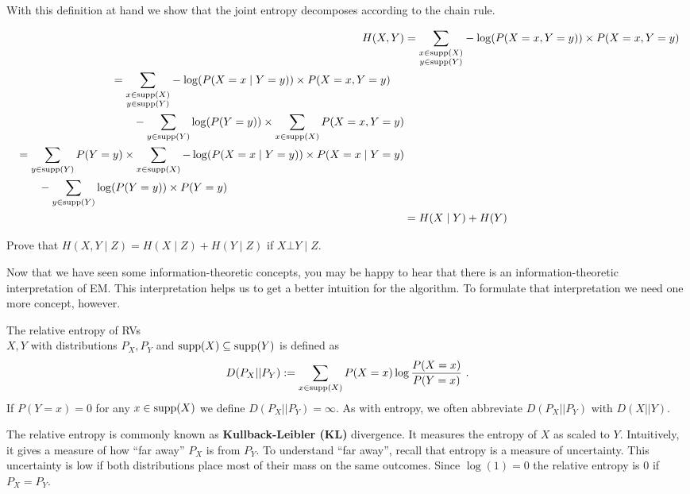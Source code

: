 With this definition at hand we show that the joint entropy decomposes according to the
chain rule.

\begin{align*}
H(X,Y) &= \underset{\substack{x \in \operatorname{supp}(X)\\y \in \operatorname{supp}(Y)}}{\sum} -\log(P(X=x,Y=y)) \times P(X=x, Y=y) \\
\begin{split}
&= \underset{\substack{x \in \operatorname{supp}(X)\\ y \in \operatorname{supp}(Y)}}{\sum} -\log(P(X=x \mid  Y=y)) \times P(X=x,Y=y) \\ 
&\qquad - \underset{y \in \operatorname{supp}(Y)}{\sum}\log(P(Y=y)) \times \sum_{x \in \operatorname{supp}(X)} P(X=x,Y=y) 
\end{split} \\
\begin{split}
&=\sum_{y \in \operatorname{supp}(Y)} P(Y=y) \times \sum_{x \in \operatorname{supp}(X)} -\log(P(X=x \mid  Y=y)) \times P(X=x \mid Y=y) \\ &\qquad - \underset{y \in \operatorname{supp}(Y)}{\sum}\log(P(Y=y)) \times P(Y=y)
\end{split} \\
&= H(X \mid Y) + H(Y)
\end{align*}

\begin{Exercise}
Prove that $ H(X,Y \mid Z) = H(X \mid Z) + H(Y \mid Z) $ if $ X \bot Y \mid Z $.
\end{Exercise}

Now that we have seen some information-theoretic concepts, you may be happy to hear that there is an information-theoretic interpretation
of EM. This interpretation helps us to get a better intuition for the algorithm. To formulate that interpretation we need
one more concept, however.

\begin{Definition}
The relative entropy of RVs \\ $ X,Y $ with distributions $P_X, P_Y$ and $\operatorname{supp}(X) \subseteq \operatorname{supp}(Y) $ is defined as
$$ D(P_X||P_Y) := \sum_{x \in \operatorname{supp}(X)} P(X=x) \log \frac{P(X=x)}{P(Y=x)} \ . $$
If $ P(Y=x) = 0 $ for any $ x \in \operatorname{supp}(X) $ we define $ D(P_X||P_Y) = \infty $. As with entropy, we often abbreviate $D(P_X||P_Y)$ with  $D(X||Y)$.
\end{Definition}

The relative entropy is commonly known as \textbf{Kullback-Leibler (KL)} divergence. It measures the entropy of $ X $ as scaled to $ Y $. Intuitively,
it gives a measure of how ``far away'' $ P_{X} $ is from $ P_{Y} $. To
understand ``far away'', recall that entropy is a measure of
uncertainty. 
This uncertainty is low if both distributions place most
of their mass on the same outcomes. Since $ \log(1) = 0 $ the relative entropy is 0 if $ P_{X} = P_{Y} $.

